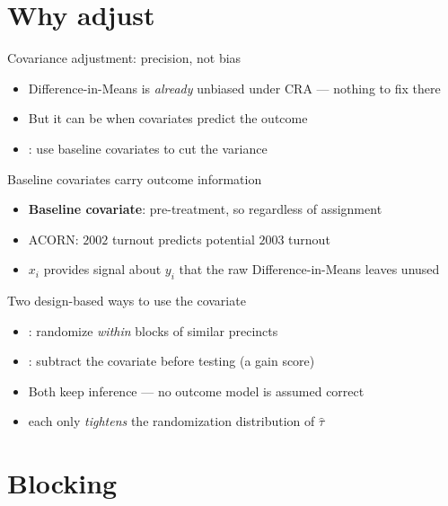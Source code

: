 \documentclass[table, xcolor = {dvipsnames}, 9pt]{beamer}
\theoremstyle{plain}
\newcommand{\mh}[1]{{\color{magenta}{#1}}}
\begin{document}
\section{Why adjust}

\begin{frame}[t]{Covariance adjustment: precision, not bias}
\vfill
\begin{itemize} \vfill
\item Difference-in-Means is \emph{already} unbiased under CRA --- nothing to fix there \vfill
\item But it can be \mh{noisy} when covariates predict the outcome \vfill
\item \mh{Covariance adjustment}: use baseline covariates to cut the variance \vfill
\end{itemize} \vfill
\end{frame}
\begin{frame}[t]{Baseline covariates carry outcome information}
\vfill
\begin{itemize} \vfill
\item \textbf{Baseline covariate}: pre-treatment, so \mh{fixed} regardless of assignment \vfill
\item ACORN: $2002$ turnout predicts potential $2003$ turnout \vfill
\item $x_i$ provides signal about $y_i$ that the raw Difference-in-Means leaves unused \vfill
\end{itemize} \vfill
\end{frame}
\begin{frame}[t]{Two design-based ways to use the covariate}
\vfill
\begin{itemize} \vfill
\item \mh{Block}: randomize \emph{within} blocks of similar precincts \vfill
\item \mh{Rescale}: subtract the covariate before testing (a gain score) \vfill
\item Both keep inference \mh{design-based} --- no outcome model is assumed correct \vfill
\item[] each only \emph{tightens} the randomization distribution of $\hat{\tau}$ \vfill
\end{itemize} \vfill
\end{frame}
\section{Blocking}
\end{document}

